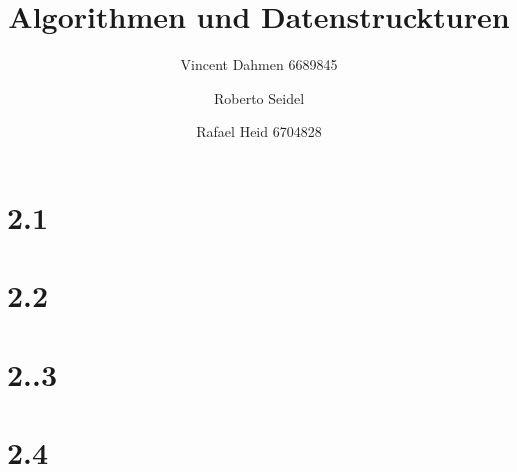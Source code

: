 \documentclass[12pt,a4paper]{article}
\title{Algorithmen und Datenstruckturen}
\author{Vincent Dahmen 6689845\and Roberto Seidel \and Rafael Heid 6704828}
\begin{document}
\maketitle{}


\section*{2.1}


\section*{2.2}


\section*{2..3}


\section*{2.4}

\end{document}
